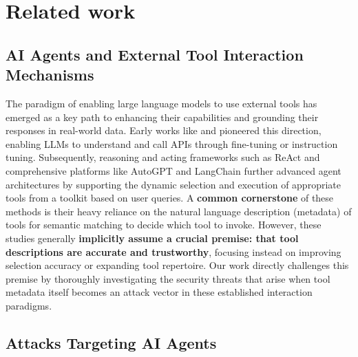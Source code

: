 \section{Related work}

\subsection{AI Agents and External Tool Interaction Mechanisms}

The paradigm of enabling large language models to use external tools has emerged as a key path to enhancing their capabilities and grounding their responses in real-world data. Early works like \citet{schick2023toolformerlanguagemodelsteach} and \citet{qin2023tool} pioneered this direction, enabling LLMs to understand and call APIs through fine-tuning or instruction tuning. Subsequently, reasoning and acting frameworks such as ReAct \cite{yao2023reactsynergizingreasoningacting} and comprehensive platforms like AutoGPT \cite{yang2023autogptonlinedecisionmaking} and LangChain \cite{langchain2023} further advanced agent architectures by supporting the dynamic selection and execution of appropriate tools from a toolkit based on user queries. A \textbf{common cornerstone} of these methods is their heavy reliance on the natural language description (metadata) of tools for semantic matching to decide which tool to invoke. However, these studies generally \textbf{implicitly assume a crucial premise: that tool descriptions are accurate and trustworthy}, focusing instead on improving selection accuracy or expanding tool repertoire. Our work directly challenges this premise by thoroughly investigating the security threats that arise when tool metadata itself becomes an attack vector in these established interaction paradigms.

\subsection{Attacks Targeting AI Agents}

